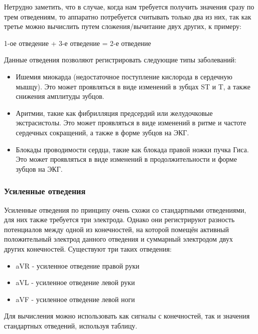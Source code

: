 \documentclass[12pt, russian]{extarticle}
\begin{document}
\begin{spacing}{1.5}
Нетрудно заметить, что в случае, когда нам требуется получить значения сразу по трем отведениям, то аппаратно потребуется считывать только два из них, так как третье можно вычислить путем сложения/вычитание двух других, к примеру:

\begin{center}
    1-ое отведение + 3-е отведение = 2-е отведение
\end{center}

Данные отведения позволяют регистрировать следующие типы заболеваний: 

\begin{itemize}
    \item Ишемия миокарда (недостаточное поступление кислорода в сердечную мышцу). Это может проявляться в виде изменений в зубцах ST и T, а также снижения амплитуды зубцов.
    \item Аритмии, такие как фибрилляция предсердий или желудочковые экстрасистолы. Это может проявляться в виде изменений в ритме и частоте сердечных сокращений, а также в форме зубцов на ЭКГ.
    \item Блокады проводимости сердца, такие как блокада правой ножки пучка Гиса. Это может проявляться в виде изменений в продолжительности и форме зубцов на ЭКГ.
\end{itemize}

\subsubsection{Усиленные отведения}

Усиленные отведения по принципу очень схожи со стандартными отведениями, для них также требуется три электрода. Однако они регистрируют разность потенциалов между одной из конечностей, на которой помещён активный положительный электрод данного отведения и суммарный электродом двух других конечностей. Существуют три таких отведения:

\begin{itemize}
    \item aVR - усиленное отведение правой руки
    \item aVL - усиленное отведение левой руки
    \item aVF - усиленное отведение левой ноги
\end{itemize}

Для вычисления можно использовать как сигналы с конечностей, так и значения стандартных отведений, используя таблицу.


\end{spacing}
\end{document}
